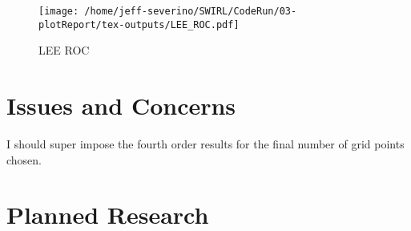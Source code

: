 \documentclass[a4paper]{article}
\begin{document}
 \begin{figure}
     \centering
     \texttt{[image: /home/jeff-severino/SWIRL/CodeRun/03-plotReport/tex-outputs/LEE\_ROC.pdf]}
     \caption{LEE ROC}
 \end{figure}




\section{Issues and Concerns}
I should super impose the fourth order results for the final number of grid points 
chosen.
\section{Planned Research}
\end{document}
